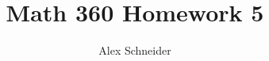 \documentclass[11pt]{article}
\title{Math 360 Homework 5}
\author{Alex Schneider}
\begin{document}
\maketitle

\begin{comment}

\section*{2.4}
\subsection*{Problem 15}
\subsubsection*{a.}
The mean lifetime can be found as follows:

\[ \mu_x = \int_0^\infty t \times 0.1e^{-0.1t} dt \]
\[ \mu_x = uv - \int_{0}^{\infty} v du \]
\[
    \begin{array}{ll}
        u = t & dv = 0.1e^{-0.1t} dt \\
        du = dt & v = -e^{-0.1t}
    \end{array} 
\]
\[ \mu_x = t\times -e^{-0.1t} \bigg\vert^\infty_0 - \int_{0}^{\infty} -e^{-0.1t} dt \]
\[ \mu_x = t\times -e^{-0.1t}  - 10e^{-0.1t} \bigg\vert^\infty_0 \]
\[ \mu_x = \left[ -e^{-0.1t} \left( t + 10  \right) \right] \bigg\vert^\infty_0\]
\[ \mu_x = \left[ \cancelto{0}{-e^{-0.1\times \infty}} \left( \infty + 10  \right) \right] - 
           \left[ -e^{-0.1\times 0} \left( 0 + 10  \right) \right] \]
\[ \mu_x = - \left[ -1 \left( 10 \right) \right] \]
\[ \mu_x = 10 \]


\end{comment}
\end{document}
